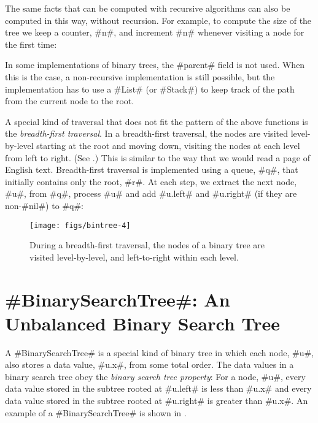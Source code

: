 The same facts that can be computed with recursive algorithms can also be
computed in this way, without recursion. For example, to compute the size
of the tree we keep a counter, #n#, and increment #n# whenever visiting
a node for the first time:

In some implementations of binary trees, the #parent# field is not used.
When this is the case, a non-recursive implementation is still possible,
but the implementation has to use a #List# (or #Stack#) to keep track
of the path from the current node to the root.

A special kind of traversal that does not fit the pattern of the above
functions is the \emph{breadth-first traversal}.  In a breadth-first
traversal, the nodes are visited level-by-level starting at the root and
moving down, visiting the nodes at each level from left to right. (See
.) This is similar to the way that we would read a
page of English text.   Breadth-first traversal is implemented using a
queue, #q#, that initially contains only the root, #r#.  At each step,
we extract the next node, #u#, from #q#, process #u# and add #u.left#
and #u.right# (if they are non-#nil#) to #q#:

\begin{figure}
  \begin{center}
    \texttt{[image: figs/bintree-4]}
  \end{center}
  \caption{During a breadth-first traversal, the nodes of a binary tree
  are visited
level-by-level, and left-to-right within each level.}
\end{figure}





\section{#BinarySearchTree#: An Unbalanced Binary Search Tree}

A #BinarySearchTree# is a special kind of binary tree in which each node, #u#,
also stores a data value, #u.x#, from some total order.  The data values in
a binary search tree obey the \emph{binary search tree property}:  For
a node, #u#, every data value stored in the subtree rooted at #u.left#
is less than #u.x# and every data value stored in the subtree rooted at
#u.right# is greater than #u.x#.  An example of a #BinarySearchTree# is shown in .

